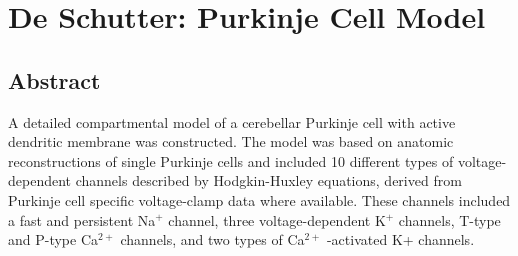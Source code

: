 \documentclass[12pt]{article}
\begin{document}
\section*{De Schutter: Purkinje Cell Model}

\subsection*{Abstract}

A detailed compartmental model of a cerebellar Purkinje
cell with active dendritic membrane was constructed. The model
was based on anatomic reconstructions of single Purkinje cells and
included 10 different types of voltage-dependent channels described
by Hodgkin-Huxley equations, derived from Purkinje cell specific
voltage-clamp data where available. These channels included
a fast and persistent Na$^+$ channel, three voltage-dependent
K$^+$ channels, T-type and P-type Ca$^{2+}$ channels, and two types of
Ca$^{2+}$ -activated K+ channels.
\end{document}
